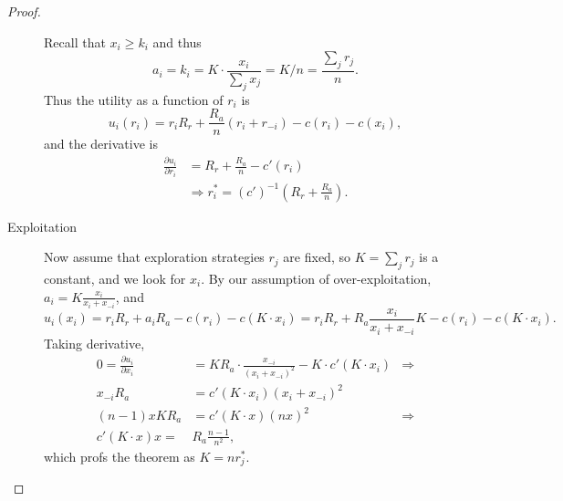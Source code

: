 \begin{proof}
\begin{description}
    Recall that $x_i\geq k_i$ and thus 
    $$a_i=k_i = K\cdot \frac{x_i}{\sum_j x_j}= K/n = \frac{\sum_j r_j}{n}.$$
    Thus the utility as a function of $r_i$ is 
    $$u_i(r_i)=r_iR_r + \frac{R_a}{n}(r_i + r_{-i})-c(r_i)-c(x_i),$$
    and the derivative is 
    \begin{align*}
        \frac{\partial u_i}{\partial r_i}&= R_r + \frac{R_a}{n}-c'(r_i)\\ &\Rightarrow
        r^*_i = (c')^{-1}(R_r + \frac{R_a}{n}).
    \end{align*}
    \item[Exploitation]  Now assume that exploration strategies $r_j$ are fixed, so $K=\sum_j r_j$ is a constant, and we look for $x_i$. By our assumption of over-exploitation, $a_i=K\frac{x_i}{x_i+x_{-i}}$, and 
    $$u_i(x_i) = r_iR_r + a_i R_a -c(r_i)-c(K\cdot x_i) = r_iR_r + R_a\frac{x_i}{x_i+x_{-i}}K  -c(r_i)-c(K\cdot x_i).$$
    Taking derivative, 
    \begin{align*}
          0=\frac{\partial u_i}{\partial x_i} & = KR_a \cdot \frac{x_{-i}}{(x_i+x_{-i})^2} - K\cdot c'(K\cdot x_i)&\Rightarrow \tag{in eq.}\\
          x_{-i} R_a &= c'(K\cdot x_i)(x_i+x_{-i})^2\tag{assuming symmetry}\\
           (n-1)x KR_a&= c'(K\cdot x)(nx)^2 &\Rightarrow\\
           c'(K \cdot x)x=&R_a \frac{n-1}{n^2}, %
    \end{align*}
    which profs the theorem as $K=nr^*_j$.
\end{description}
\end{proof}

